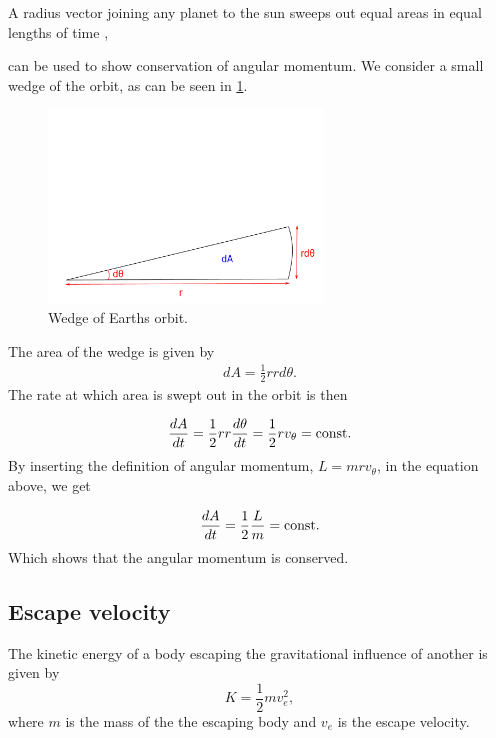 \documentclass[../main.tex]{subfiles}
\begin{document}
\begin{displayquote}
A radius vector joining any planet to the sun sweeps out equal areas in equal lengths of time \cite{Kepler2nd}, 
\end{displayquote} can be used to show conservation of angular momentum. We consider a small wedge of the orbit, as can be seen in \cref{fig:wedge}.

\begin{figure}[htb!]
    \centering
    \includegraphics[trim=1cm 0.5cm 0.cm 8.5cm, clip,width=0.65\textwidth]{../figures/wedge_of_orbit.pdf}
    \caption{Wedge of Earths orbit.}
    \label{fig:wedge}
\end{figure}

The area of the wedge is given by
\begin{align*}
    dA = \frac{1}{2}rrd\theta.
\end{align*} The rate at which area is swept out in the orbit is then 

\begin{align*}
    \frac{dA}{dt}=\frac{1}{2}rr\frac{d\theta}{dt}=\frac{1}{2}rv_{\theta}=\textnormal{const.}
\end{align*} By inserting the definition of angular momentum, \ensuremath{L=mrv_{\theta}}, in the equation above, we get

\begin{align*}
    \frac{dA}{dt}=\frac{1}{2}\frac{L}{m}=\textnormal{const.}
\end{align*} Which shows that the angular momentum is conserved. 

\subsection{Escape velocity}

The kinetic energy of a body escaping the gravitational influence of another is given by \begin{equation}
    K = \frac{1}{2} m v_{e}^{2},
\end{equation} where $m$ is the mass of the the escaping body and $v_e$ is the escape velocity. 
\end{document}
